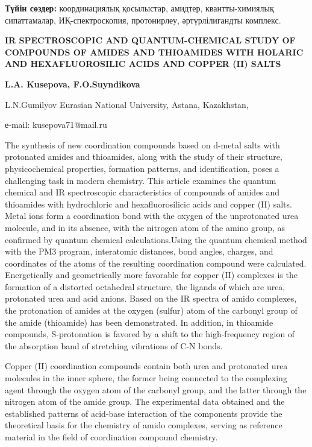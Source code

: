 {\bfseries Түйін сөздер:} координациялық қосылыстар, амидтер,
квантты-химиялық сипаттамалар, ИҚ-спектроскопия, протонирлеу,
әртүрлілигандты комплекс.

\begin{center}
{\large\bfseries IR SPECTROSCOPIC AND QUANTUM-CHEMICAL STUDY OF COMPOUNDS OF AMIDES AND THIOAMIDES WITH HOLARIC AND HEXAFLUOROSILIC ACIDS AND COPPER (II) SALTS}

{\bfseries L.A. Kusepova, F.O.Suyndikova}

L.N.Gumilyov Eurasian National University, Astana, Kazakhstan,

е-mail: kusepova71@mail.ru
\end{center}

The synthesis of new coordination compounds based on d-metal salts with
protonated amides and thioamides, along with the study of their
structure, physicochemical properties, formation patterns, and
identification, poses a challenging task in modern chemistry. This
article examines the quantum chemical and IR spectroscopic
characteristics of compounds of amides and thioamides with hydrochloric
and hexafluorosilicic acids and copper (II) salts. Metal ions form a
coordination bond with the oxygen of the unprotonated urea molecule, and
in its absence, with the nitrogen atom of the amino group, as confirmed
by quantum chemical calculations.Using the quantum chemical method with
the PM3 program, interatomic distances, bond angles, charges, and
coordinates of the atoms of the resulting coordination compound were
calculated. Energetically and geometrically more favorable for copper
(II) complexes is the formation of a distorted octahedral structure, the
ligands of which are urea, protonated urea and acid anions. Based on the
IR spectra of amido complexes, the protonation of amides at the oxygen
(sulfur) atom of the carbonyl group of the amide (thioamide) has been
demonstrated. In addition, in thioamide compounds, S-protonation is
favored by a shift to the high-frequency region of the absorption band
of stretching vibrations of C-N bonds.

Copper (II) coordination compounds contain both urea and protonated urea
molecules in the inner sphere, the former being connected to the
complexing agent through the oxygen atom of the carbonyl group, and the
latter through the nitrogen atom of the amide group. The experimental
data obtained and the established patterns of acid-base interaction of
the components provide the theoretical basis for the chemistry of amido
complexes, serving as reference material in the field of coordination
compound chemistry.

